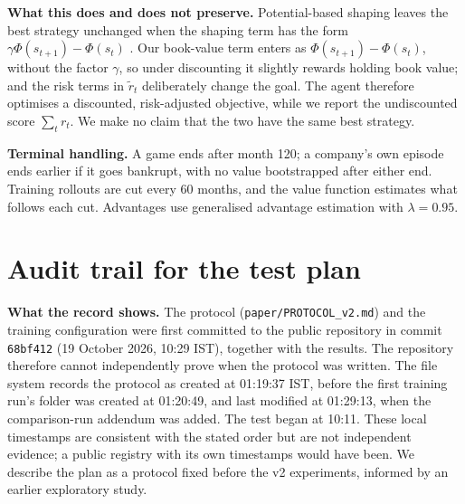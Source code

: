 \documentclass[11pt]{article}
\begin{document}
\textbf{What this does and does not preserve.} Potential-based shaping leaves the best strategy unchanged when the shaping term has the form $\gamma\Phi(s_{t+1})-\Phi(s_t)$ \citep{ng1999shaping}. Our book-value term enters as $\Phi(s_{t+1})-\Phi(s_t)$, without the factor $\gamma$, so under discounting it slightly rewards holding book value; and the risk terms in $\tilde r_t$ deliberately change the goal. The agent therefore optimises a discounted, risk-adjusted objective, while we report the undiscounted score $\sum_t r_t$. We make no claim that the two have the same best strategy.

\textbf{Terminal handling.} A game ends after month 120; a company's own episode ends earlier if it goes bankrupt, with no value bootstrapped after either end. Training rollouts are cut every 60 months, and the value function estimates what follows each cut. Advantages use generalised advantage estimation with $\lambda=0.95$.

\section{Audit trail for the test plan}
\label{app:audit}

\textbf{What the record shows.} The protocol (\texttt{paper/PROTOCOL\_v2.md}) and the training configuration were first committed to the public repository in commit \texttt{68bf412} (19 October 2026, 10:29 IST), together with the results. The repository therefore cannot independently prove when the protocol was written. The file system records the protocol as created at 01:19:37 IST, before the first training run's folder was created at 01:20:49, and last modified at 01:29:13, when the comparison-run addendum was added. The test began at 10:11. These local timestamps are consistent with the stated order but are not independent evidence; a public registry with its own timestamps would have been. We describe the plan as a protocol fixed before the v2 experiments, informed by an earlier exploratory study.
\end{document}

